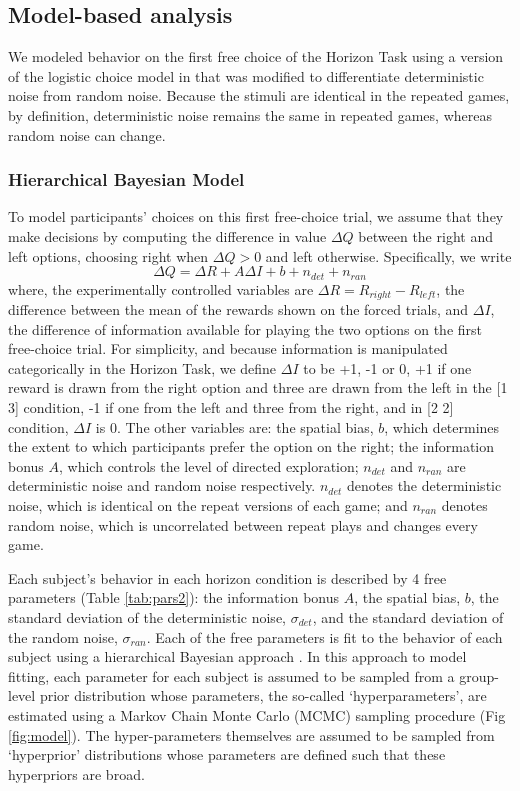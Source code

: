 \documentclass[12pt]{article}
\begin{document}
{\subsection*{Model-based analysis}
We modeled behavior on the first free choice of the Horizon Task using a version of the logistic choice model in \cite{wilson2014} that was modified to differentiate deterministic noise from random noise. Because the stimuli are identical in the repeated games, by definition, deterministic noise remains the same in repeated games, whereas random noise can change. 

\subsubsection*{Hierarchical Bayesian Model}

To model participants' choices on this first free-choice trial, we assume that they make decisions by computing the difference in value $\Delta Q$ between the right and left options, choosing right when $\Delta Q > 0$ and left otherwise.  Specifically, we write
\begin{equation}
\Delta Q= \Delta R+A \Delta I+b+n_{det}+n_{ran}
\end{equation}
where, the experimentally controlled variables are $\Delta R=R_{right}-R_{left}$, the difference between the mean of the rewards shown on the forced trials, and $\Delta I$, the difference of information available for playing the two options on the first free-choice trial. For simplicity, and because information is manipulated categorically in the Horizon Task, we define $\Delta I$ to be +1, -1 or 0, +1 if one reward is drawn from the right option and three are drawn from the left in the [1 3] condition, -1 if one from the left and three from the right, and in [2 2] condition, $\Delta I$ is 0. The other variables are: the spatial bias, $b$, which determines the extent to which participants prefer the option on the right; the information bonus $A$, which controls the level of directed exploration; $n_{det}$ and $n_{ran}$ are deterministic noise and random noise respectively. $n_{det}$ denotes the deterministic noise, which is identical on the repeat versions of each game; and $n_{ran}$ denotes random noise, which is uncorrelated between repeat plays and changes every game.

Each subject's behavior in each horizon condition is described by 4 free parameters (Table \ref{tab:pars2}): the information bonus $A$, the spatial bias, $b$, the standard deviation of the deterministic noise, $\sigma_{det}$, and the standard deviation of the random noise, $\sigma_{ran}$. Each of the free parameters is fit to the behavior of each subject using a hierarchical Bayesian approach \citep{hbm1}.  In this approach to model fitting, each parameter for each subject is assumed to be sampled from a group-level prior distribution whose parameters, the so-called `hyperparameters', are estimated using a Markov Chain Monte Carlo (MCMC) sampling procedure (Fig \ref{fig:model}). The hyper-parameters themselves are assumed to be sampled from `hyperprior' distributions whose parameters are defined such that these hyperpriors are broad.  

}
\end{document}
